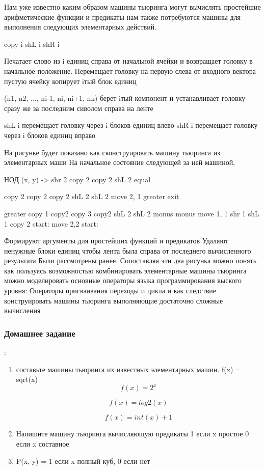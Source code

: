 Нам уже известно каким образом машины тьюринга могут вычислять простейшие арифметические функции и предикаты нам также потребуются машины для выполнения следующих элементарных действий. 

copy i
shL i
shR i

Печатает слово из i единиц справа от начальной ячейки и возвращает головку в начальное положение.
Перемещает головку на первую слева от входного вектора пустую ячейку копирует iтый блок единиц

(n1, n2, ..., ni-1, ni, ni+1, nk)
берет iтый компонент и устанавливает головку сразу же за последним сиволом справа на ленте

shL i перемещает головку через i блоков единиц влево
shR i перемещает головку через i блоков единиц вправо

На рисунке будет показано как сконструировать машину тьюринга из элементарных маши
На начальное состояние следующей за ней машиной, 

НОД (x, y) -> shr 2
	      copy 2 
	      copy 2
	      shL 2
	      equal

copy 2				copy 2
				copy 2
shL 2				shL 2
move 2, 1			greater
exit

		greater
copy 1				copy2
copy 3				copy2
shL 2				shL 2
monus				monus
move 1, 1			shr 1
shL 1				copy 2
start:				move 2,2
				start:
				
Формируют аргументы для простейших функций и предикатов
Удаляют ненужные блоки единиц чтобы лента была справа от последнего вычисленного результата
Были рассмотрены ранее. Сопоставляя эти два рисунка можно понять как пользуясь возможностью комбинировать элементарные машины тьюринга можно моделировать
основные операторы языка программирования выского уровня:
Операторы присваивания переходы и цикла и как следствие конструировать машины тьюринга выполняющие достаточно сложные вычисления

\subsubsection{Домашнее задание}:
\begin{enumerate}
\item составьте машины тьюринга их известных элементарных машин. f(x) = sqrt(x)
$$f(x) = 2^x $$

$$f(x) = log2(x)$$

$$f(x) = int(x) + 1$$

\item Напишите машину тьюринга вычисляющую предикаты
	1 если x простое
	0 если x составное

\item P(x, y) = 1 если x полный куб, 0 если нет
\end{enumerate}

